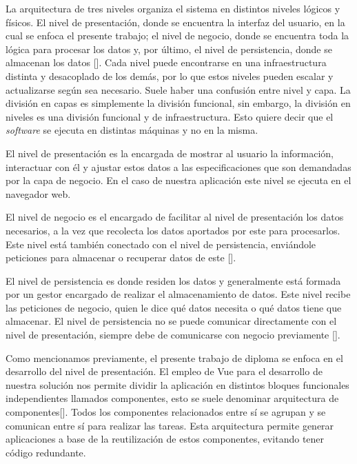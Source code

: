 La arquitectura de tres niveles organiza el sistema en distintos niveles lógicos y físicos. El nivel de presentación, donde se encuentra la interfaz del usuario, en la cual se enfoca el presente trabajo; el nivel de negocio, donde se encuentra toda la lógica para procesar los datos y, por último, el nivel de persistencia, donde se almacenan los datos [\cite{96}]. Cada nivel puede encontrarse en una infraestructura distinta y desacoplado de los demás, por lo que estos niveles pueden escalar y actualizarse según sea necesario. Suele haber una confusión entre nivel y capa. La división en capas es simplemente la división funcional, sin embargo, la división en niveles es una división funcional y de infraestructura. Esto quiere decir que el \textit{software} se ejecuta en distintas máquinas y no en la misma.

El nivel de presentación es la encargada de mostrar al usuario la información, interactuar con él y ajustar estos datos a las especificaciones que son demandadas por la capa de negocio. En el caso de nuestra aplicación este nivel se ejecuta en el navegador web. 

El nivel de negocio es el encargado de facilitar al nivel de presentación los datos necesarios, a la vez que recolecta los datos aportados por este para procesarlos. Este nivel está también conectado con el nivel de persistencia, enviándole peticiones para almacenar o recuperar datos de este [\cite{96}].

El nivel de persistencia es donde residen los datos y generalmente está formada por un gestor encargado de realizar el almacenamiento de datos. Este nivel recibe las peticiones de negocio, quien le dice qué datos necesita o qué datos tiene que almacenar. El nivel de persistencia no se puede comunicar directamente con el nivel de presentación, siempre debe de comunicarse con negocio previamente [\cite{96}]. 

%

Como mencionamos previamente, el presente trabajo de diploma se enfoca en el desarrollo del nivel de presentación. El empleo de Vue para el desarrollo de nuestra solución nos permite dividir la aplicación en distintos bloques funcionales independientes llamados componentes, esto se suele denominar arquitectura de componentes[\cite{50}]. Todos los componentes relacionados entre sí se agrupan y se comunican entre sí para realizar las tareas. Esta arquitectura permite generar aplicaciones a base de la reutilización de estos componentes, evitando tener código redundante.

